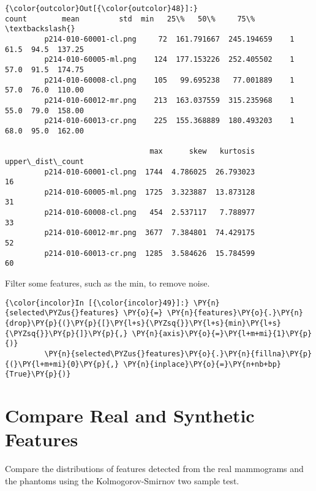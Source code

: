             \begin{Verbatim}[commandchars=\\\{\}]
{\color{outcolor}Out[{\color{outcolor}48}]:}                        count        mean         std  min   25\%   50\%     75\%  \textbackslash{}
         p214-010-60001-cl.png     72  161.791667  245.194659    1  61.5  94.5  137.25
         p214-010-60005-ml.png    124  177.153226  252.405502    1  57.0  91.5  174.75
         p214-010-60008-cl.png    105   99.695238   77.001889    1  57.0  76.0  110.00
         p214-010-60012-mr.png    213  163.037559  315.235968    1  55.0  79.0  158.00
         p214-010-60013-cr.png    225  155.368889  180.493203    1  68.0  95.0  162.00

                                 max      skew   kurtosis  upper\_dist\_count
         p214-010-60001-cl.png  1744  4.786025  26.793023                16
         p214-010-60005-ml.png  1725  3.323887  13.873128                31
         p214-010-60008-cl.png   454  2.537117   7.788977                33
         p214-010-60012-mr.png  3677  7.384801  74.429175                52
         p214-010-60013-cr.png  1285  3.584626  15.784599                60
\end{Verbatim}

    Filter some features, such as the min, to remove noise.

    \begin{Verbatim}[commandchars=\\\{\}]
{\color{incolor}In [{\color{incolor}49}]:} \PY{n}{selected\PYZus{}features} \PY{o}{=} \PY{n}{features}\PY{o}{.}\PY{n}{drop}\PY{p}{(}\PY{p}{[}\PY{l+s}{\PYZsq{}}\PY{l+s}{min}\PY{l+s}{\PYZsq{}}\PY{p}{]}\PY{p}{,} \PY{n}{axis}\PY{o}{=}\PY{l+m+mi}{1}\PY{p}{)}
         \PY{n}{selected\PYZus{}features}\PY{o}{.}\PY{n}{fillna}\PY{p}{(}\PY{l+m+mi}{0}\PY{p}{,} \PY{n}{inplace}\PY{o}{=}\PY{n+nb+bp}{True}\PY{p}{)}
\end{Verbatim}

    \section{Compare Real and Synthetic
Features}\label{compare-real-and-synthetic-features}

    Compare the distributions of features detected from the real mammograms
and the phantoms using the Kolmogorov-Smirnov two sample test.

